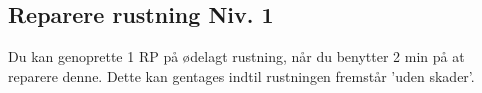 \subsection*{Reparere rustning Niv. 1}
Du kan genoprette 1 RP på ødelagt rustning, når du benytter 2 min på at reparere denne. Dette kan gentages indtil rustningen fremstår 'uden skader'.\\